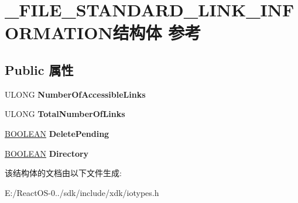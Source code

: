 \hypertarget{struct___f_i_l_e___s_t_a_n_d_a_r_d___l_i_n_k___i_n_f_o_r_m_a_t_i_o_n}{}\section{\+\_\+\+F\+I\+L\+E\+\_\+\+S\+T\+A\+N\+D\+A\+R\+D\+\_\+\+L\+I\+N\+K\+\_\+\+I\+N\+F\+O\+R\+M\+A\+T\+I\+O\+N结构体 参考}
\label{struct___f_i_l_e___s_t_a_n_d_a_r_d___l_i_n_k___i_n_f_o_r_m_a_t_i_o_n}
\subsection*{Public 属性}
\begin{DoxyCompactItemize}
\item 
\mbox{\label{struct___f_i_l_e___s_t_a_n_d_a_r_d___l_i_n_k___i_n_f_o_r_m_a_t_i_o_n_a920fb25d704b0c5cf2538a68210c6abb}} 
U\+L\+O\+NG {\bfseries Number\+Of\+Accessible\+Links}
\item 
\mbox{\label{struct___f_i_l_e___s_t_a_n_d_a_r_d___l_i_n_k___i_n_f_o_r_m_a_t_i_o_n_a2ee1a6abdd12c892853c9de080bd9fdd}} 
U\+L\+O\+NG {\bfseries Total\+Number\+Of\+Links}
\item 
\mbox{\label{struct___f_i_l_e___s_t_a_n_d_a_r_d___l_i_n_k___i_n_f_o_r_m_a_t_i_o_n_a5f140e20043075f77c98d3ea71575ccb}} 
\hyperlink{_processor_bind_8h_a112e3146cb38b6ee95e64d85842e380a}{B\+O\+O\+L\+E\+AN} {\bfseries Delete\+Pending}
\item 
\mbox{\label{struct___f_i_l_e___s_t_a_n_d_a_r_d___l_i_n_k___i_n_f_o_r_m_a_t_i_o_n_a5442e6049da6f2f575d7ef30c3a6eae7}} 
\hyperlink{_processor_bind_8h_a112e3146cb38b6ee95e64d85842e380a}{B\+O\+O\+L\+E\+AN} {\bfseries Directory}
\end{DoxyCompactItemize}


该结构体的文档由以下文件生成\+:\begin{DoxyCompactItemize}
\item 
E\+:/\+React\+O\+S-\/0../sdk/include/xdk/iotypes.\+h\end{DoxyCompactItemize}
